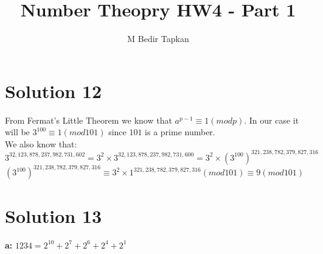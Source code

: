 \documentclass[12pt]{article}
\title{Number Theopry HW4 - Part 1}
\author{M Bedir Tapkan}
\begin{document}
	\maketitle\textsl{}

\section*{Solution 12}
From Fermat's Little Theorem we know that $a^{p-1} \equiv 1 (mod p)$. In our case it will be $3^{100} \equiv 1 (mod 101)$ since $101$ is a prime number.\\
We also know that:\\
$3^{32,123,878,237,982,731,602}  = 3^2 \times 3^{32,123,878,237,982,731,600} = 3^2 \times (3^{100})^{321,238,782,379,827,316}$\\
$(3^{100})^{321,238,782,379,827,316} \equiv 3^2 \times 1^{321,238,782,379,827,316} (mod 101) \equiv 9 (mod 101)$

\section*{Solution 13}
\textbf{a:} $1234 = 2^{10} + 2^7 + 2^6 + 2^4 + 2^1$\\
\end{document}
